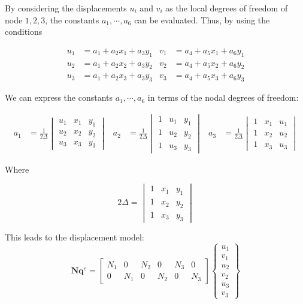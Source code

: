 By considering the displacements $ u_i $ and $ v_i $ as the local degrees of freedom of node $ 1,2,3 $, the constants $ a_1, \cdots, a_6 $ can be evaluated. Thus, by using the conditions

\begin{align*}
	u_1 &= a_1 + a_2 x_1 + a_3 y_1 & v_1 &= a_4 + a_5 x_1 + a_6 y_1 \\
	u_2 &= a_1 + a_2 x_2 + a_3 y_2 & v_2 &= a_4 + a_5 x_2 + a_6 y_2 \\
	u_3 &= a_1 + a_2 x_3 + a_3 y_3 & v_3 &= a_4 + a_5 x_3 + a_6 y_3
\end{align*}

We can express the constants $ a_1, \cdots, a_6 $ in terms of the nodal degrees of freedom:

\begin{align*}
	a_1 &= \frac{1}{2\Delta} 
	\begin{vmatrix}
		u_1 & x_1 & y_1 \\ 
		u_2 & x_2 & y_2 \\ 
		u_3 & x_3 & y_3
	\end{vmatrix} & a_2 &= \frac{1}{2\Delta} 
	\begin{vmatrix}
		1 & u_1 & y_1 \\ 
		1 & u_2 & y_2 \\ 
		1 & u_3 & y_3
	\end{vmatrix} & a_3 &= \frac{1}{2\Delta} 
	\begin{vmatrix}
		1 & x_1 & u_1 \\ 
		1 & x_2 & u_2 \\ 
		1 & x_3 & u_3
	\end{vmatrix} 
\end{align*}

Where 

\begin{equation*}
2\Delta = \begin{vmatrix}
	1 & x_1 & y_1 \\ 
	1 & x_2 & y_2 \\ 
	1 & x_3 & y_3
\end{vmatrix}
\end{equation*}

This leads to the displacement model:
\begin{equation*}
	\mathbf{N} \mathbf{q}^e = \begin{bmatrix}
	N_1 & 0 & N_2 & 0 & N_3 & 0 \\ 
	0 & N_1 & 0 & N_2 & 0 & N_3
\end{bmatrix} \left\lbrace\begin{array}{c}
u_1 \\ 
v_1 \\ 
u_2 \\ 
v_2 \\ 
u_3 \\ 
v_3
\end{array} \right\rbrace
\end{equation*}

